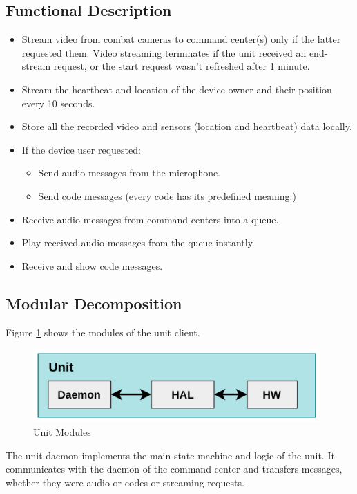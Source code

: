 \subsection{Functional Description}
\begin{itemize}[itemsep=1pt, topsep=5pt]
    \item Stream video from combat cameras to command center(s) only if the latter requested them. Video streaming terminates if the unit received an end-stream request, or the start request wasn’t refreshed after 1 minute.
    \item Stream the heartbeat and location of the device owner and their position every 10 seconds.
    \item Store all the recorded video and sensors (location and heartbeat) data locally.
    \item If the device user requested:
        \begin{itemize}[itemsep=1pt, topsep=5pt]
            \item Send audio messages from the microphone.
            \item Send code messages (every code has its predefined meaning.)
        \end{itemize}
    \item Receive audio messages from command centers into a queue.
    \item Play received audio messages from the queue instantly.
    \item Receive and show code messages.
\end{itemize}

\subsection{Modular Decomposition}
Figure \ref{fig:unit-modules} shows the modules of the unit client.

\begin{figure}
    \centering
    \includegraphics[width=11cm]{images/unit-modules.png}
    \caption{Unit Modules}
    \label{fig:unit-modules}
\end{figure}

The unit daemon implements the main state machine and logic of the unit.
It communicates with the daemon of the command center and transfers messages, whether they were audio or codes or streaming requests.

